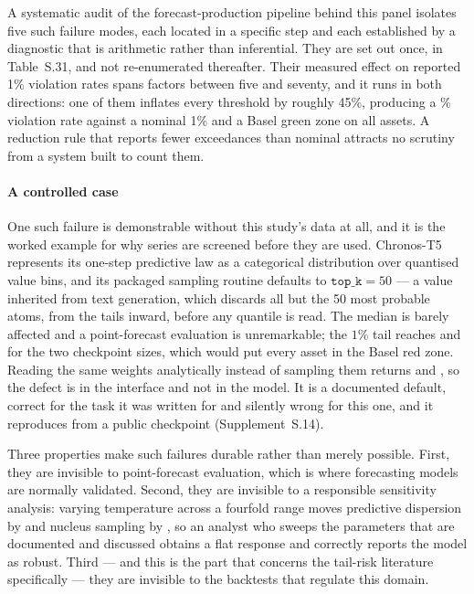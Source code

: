\documentclass[preprint,11pt,authoryear]{elsarticle}
\newcommand{\1}{\boldsymbol{1}}
\begin{document}
A systematic audit of the forecast-production pipeline behind this panel isolates
five such failure modes, each located in a specific step and each established by
a diagnostic that is arithmetic rather than inferential. They are set out once,
in Table~S.31, and not re-enumerated thereafter. Their
measured effect on reported 1\% violation rates spans factors between five and seventy, and it runs in both directions: one of them inflates every threshold by
roughly 45\%, producing a \nRawPiGJRDefectivePct\% violation rate against a nominal 1\% and a Basel
green zone on all \nMainAssets{} assets. A reduction rule that reports fewer
exceedances than nominal attracts no scrutiny from a system built to count them.

\paragraph{A controlled case} One such failure is demonstrable without this
study's data at all, and it is the worked example for why series are screened
before they are used. Chronos-T5 \citep{ansari2024chronos} represents its
one-step predictive law as a categorical distribution over quantised value bins,
and its packaged sampling routine defaults to $\texttt{top\_k} = 50$ --- a value
inherited from text generation, which discards all but the 50 most probable
atoms, from the tails inward, before any quantile is read. The median is barely
affected and a point-forecast evaluation is unremarkable; the $1\%$ tail reaches
\nPiSmallDefaultOne{} and \nPiMiniDefaultOne{} for the two checkpoint sizes,
which would put every asset in the Basel red zone. Reading the same weights
analytically instead of sampling them returns \nPiSmallAnalyticOne{} and
\nPiMiniAnalyticOne, so the defect is in the interface and not in the model. It
is a documented default, correct for the task it was written for and silently
wrong for this one, and it reproduces from a public checkpoint
(Supplement~S.14).

Three properties make such failures durable rather than merely possible. First,
they are invisible to point-forecast evaluation, which is where forecasting
models are normally validated. Second, they are invisible to a responsible
sensitivity analysis: varying temperature across a fourfold range moves predictive dispersion by \nLitTempGap{} and nucleus sampling by \nLitNucleusGap, so an analyst who
sweeps the parameters that are documented and discussed obtains a flat response
and correctly reports the model as robust. Third --- and this is the part that
concerns the tail-risk literature specifically --- they are invisible to the
backtests that regulate this domain.
\end{document}
